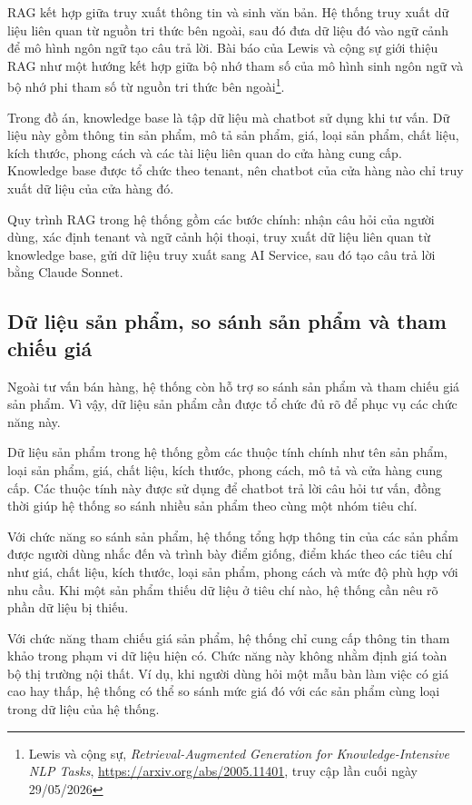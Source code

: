 \documentclass[../DoAn.tex]{subfiles}
\begin{document}
RAG kết hợp giữa truy xuất thông tin và sinh văn bản. Hệ thống truy xuất dữ liệu liên quan từ nguồn tri thức bên ngoài, sau đó đưa dữ liệu đó vào ngữ cảnh để mô hình ngôn ngữ tạo câu trả lời. Bài báo của Lewis và cộng sự giới thiệu RAG như một hướng kết hợp giữa bộ nhớ tham số của mô hình sinh ngôn ngữ và bộ nhớ phi tham số từ nguồn tri thức bên ngoài\footnote{Lewis và cộng sự, \textit{Retrieval-Augmented Generation for Knowledge-Intensive NLP Tasks}, \url{https://arxiv.org/abs/2005.11401}, truy cập lần cuối ngày 29/05/2026}.

Trong đồ án, knowledge base là tập dữ liệu mà chatbot sử dụng khi tư vấn. Dữ liệu này gồm thông tin sản phẩm, mô tả sản phẩm, giá, loại sản phẩm, chất liệu, kích thước, phong cách và các tài liệu liên quan do cửa hàng cung cấp. Knowledge base được tổ chức theo tenant, nên chatbot của cửa hàng nào chỉ truy xuất dữ liệu của cửa hàng đó.

Quy trình RAG trong hệ thống gồm các bước chính: nhận câu hỏi của người dùng, xác định tenant và ngữ cảnh hội thoại, truy xuất dữ liệu liên quan từ knowledge base, gửi dữ liệu truy xuất sang AI Service, sau đó tạo câu trả lời bằng Claude Sonnet.

\subsection{Dữ liệu sản phẩm, so sánh sản phẩm và tham chiếu giá}
\label{subsection:3.1.3}

Ngoài tư vấn bán hàng, hệ thống còn hỗ trợ so sánh sản phẩm và tham chiếu giá sản phẩm. Vì vậy, dữ liệu sản phẩm cần được tổ chức đủ rõ để phục vụ các chức năng này.

Dữ liệu sản phẩm trong hệ thống gồm các thuộc tính chính như tên sản phẩm, loại sản phẩm, giá, chất liệu, kích thước, phong cách, mô tả và cửa hàng cung cấp. Các thuộc tính này được sử dụng để chatbot trả lời câu hỏi tư vấn, đồng thời giúp hệ thống so sánh nhiều sản phẩm theo cùng một nhóm tiêu chí.

Với chức năng so sánh sản phẩm, hệ thống tổng hợp thông tin của các sản phẩm được người dùng nhắc đến và trình bày điểm giống, điểm khác theo các tiêu chí như giá, chất liệu, kích thước, loại sản phẩm, phong cách và mức độ phù hợp với nhu cầu. Khi một sản phẩm thiếu dữ liệu ở tiêu chí nào, hệ thống cần nêu rõ phần dữ liệu bị thiếu.

Với chức năng tham chiếu giá sản phẩm, hệ thống chỉ cung cấp thông tin tham khảo trong phạm vi dữ liệu hiện có. Chức năng này không nhằm định giá toàn bộ thị trường nội thất. Ví dụ, khi người dùng hỏi một mẫu bàn làm việc có giá cao hay thấp, hệ thống có thể so sánh mức giá đó với các sản phẩm cùng loại trong dữ liệu của hệ thống.
\end{document}
